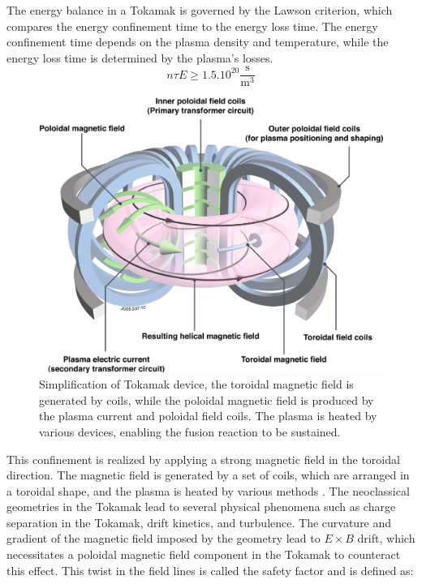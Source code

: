\documentclass[11pt,openany]{report}
\begin{document}
\begin{multicols}{2}
    The energy balance in a Tokamak is governed by the Lawson criterion, which compares the energy confinement time to the energy loss time. The energy confinement time depends on the plasma density and temperature, while the energy loss time is determined by the plasma's losses.
    $$n \tau E \ge 1.5.10^{20}{\frac {\mathrm {s} }{\mathrm {m} ^{3}}}$$
    \begin{figure}[H]
        \centering
        \includegraphics[width=1\linewidth]{./figures/tokamak.png}
        \caption{Simplification of Tokamak device, the toroidal magnetic field is generated by coils, while the poloidal magnetic field is produced by the plasma current and poloidal field coils. The plasma is heated by various devices, enabling the fusion reaction to be sustained.}
        \label{}
    \end{figure}
    This confinement is realized by applying a strong magnetic field in the toroidal direction. The magnetic field is generated by a set of coils, which are arranged in a toroidal shape, and the plasma is heated by various methods \cite{Heating}. The neoclassical geometries in the Tokamak lead to several physical phenomena such as charge separation in the Tokamak, drift kinetics, and turbulence. The curvature and gradient of the magnetic field \cite{piel2018plasma} imposed by the geometry lead to $E \times B$ drift, which necessitates a poloidal magnetic field component in the Tokamak to counteract this effect. This twist in the field lines is called the safety factor and is defined as:


\end{multicols}
\end{document}
